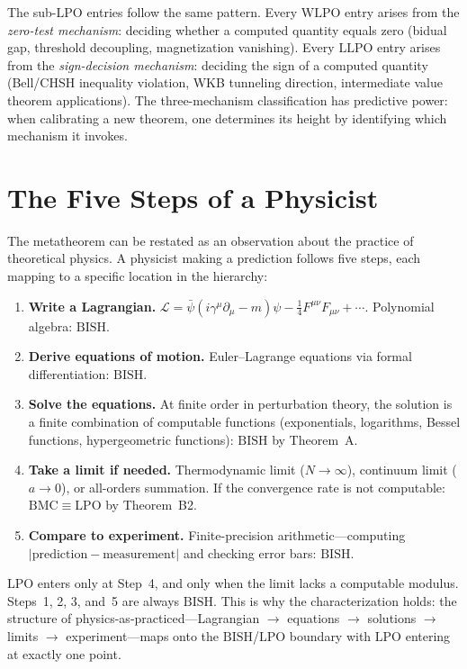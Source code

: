 \documentclass[11pt,a4paper]{report}
\theoremstyle{plain}
\theoremstyle{definition}
\theoremstyle{remark}
\newcommand{\BISH}{\mathrm{BISH}}
\newcommand{\LLPO}{\mathrm{LLPO}}
\newcommand{\WLPO}{\mathrm{WLPO}}
\newcommand{\LPO}{\mathrm{LPO}}
\newcommand{\BMC}{\mathrm{BMC}}
\begin{document}
The sub-$\LPO$ entries follow the same pattern. Every $\WLPO$ entry arises from the \emph{zero-test mechanism}: deciding whether a computed quantity equals zero (bidual gap, threshold decoupling, magnetization vanishing). Every $\LLPO$ entry arises from the \emph{sign-decision mechanism}: deciding the sign of a computed quantity (Bell/CHSH inequality violation, WKB tunneling direction, intermediate value theorem applications). The three-mechanism classification has predictive power: when calibrating a new theorem, one determines its height by identifying which mechanism it invokes.

\section{The Five Steps of a Physicist}

The metatheorem can be restated as an observation about the practice of theoretical physics. A physicist making a prediction follows five steps, each mapping to a specific location in the hierarchy:
\begin{enumerate}[nosep]
\item \textbf{Write a Lagrangian.} $\mathcal{L} = \bar\psi(i\gamma^\mu\partial_\mu - m)\psi - \tfrac{1}{4}F^{\mu\nu}F_{\mu\nu} + \cdots$. Polynomial algebra: $\BISH$.
\item \textbf{Derive equations of motion.} Euler--Lagrange equations via formal differentiation: $\BISH$.
\item \textbf{Solve the equations.} At finite order in perturbation theory, the solution is a finite combination of computable functions (exponentials, logarithms, Bessel functions, hypergeometric functions): $\BISH$ by Theorem~A.
\item \textbf{Take a limit if needed.} Thermodynamic limit ($N \to \infty$), continuum limit ($a \to 0$), or all-orders summation. If the convergence rate is not computable: $\BMC \equiv \LPO$ by Theorem~B2.
\item \textbf{Compare to experiment.} Finite-precision arithmetic---computing $|\text{prediction} - \text{measurement}|$ and checking error bars: $\BISH$.
\end{enumerate}

$\LPO$ enters only at Step~4, and only when the limit lacks a computable modulus. Steps~1, 2, 3, and~5 are always $\BISH$. This is why the characterization holds: the structure of physics-as-practiced---Lagrangian $\to$ equations $\to$ solutions $\to$ limits $\to$ experiment---maps onto the $\BISH$/$\LPO$ boundary with $\LPO$ entering at exactly one point.
\end{document}
